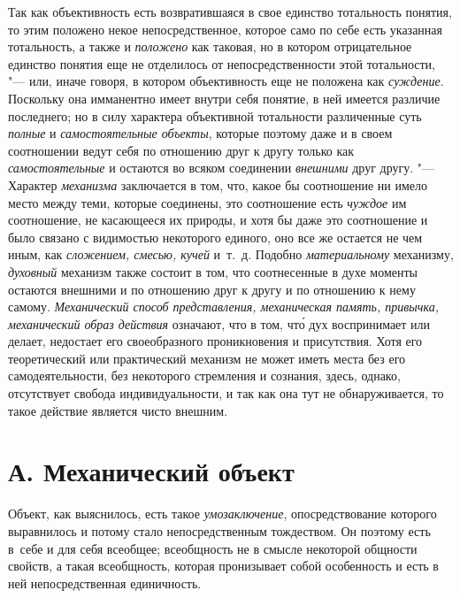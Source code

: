 Так как объективность есть возвратившаяся в свое единство
тотальность понятия, то этим положено некое непосредственное, которое само
по себе есть указанная тотальность, а также и {\em положено} как
таковая, но в котором отрицательное единство понятия еще не отделилось от
непосредственности этой тотальности, "--- или, иначе говоря, в
котором объективность еще не положена как {\em суждение}. Поскольку
она имманентно имеет внутри себя понятие, в ней имеется различие
последнего; но в силу характера объективной тотальности различенные суть
{\em полные} и {\em самостоятельные объекты},
которые поэтому даже и в своем соотношении ведут себя по
отношению друг к другу только как {\em самостоятельные} и
остаются во всяком соединении {\em внешними} друг другу. "--- Характер
{\em механизма} заключается в том, что, какое бы соотношение ни имело место
между теми, которые соединены, это соотношение есть {\em чуждое} им
соотношение, не касающееся их природы, и хотя бы даже это соотношение и
было связано с видимостью некоторого единого, оно все же остается не чем
иным, как {\em сложением, смесью, кучей} и~т.~д. Подобно {\em материальному}
механизму, {\em духовный}
механизм также состоит в том, что соотнесенные в духе моменты
остаются внешними и по отношению друг к другу и по отношению к нему самому.
{\em Механический способ представления, механическая память,
привычка, механический образ действия} означают, что в том,
чт\'{о} дух воспринимает или делает, недостает его
своеобразного проникновения и присутствия. Хотя его
теоретический или практический механизм не может иметь места без его
самодеятельности, без некоторого стремления и сознания, здесь, однако,
отсутствует свобода индивидуальности, и так как она тут не обнаруживается,
то такое действие является чисто внешним.

\section[А. Механический объект]{А. Механический объект}

Объект, как выяснилось, есть такое {\em умозаключение},
опосредствование которого выравнилось и потому стало непосредственным
тождеством. Он поэтому есть в~себе и для себя всеобщее; всеобщность не в
смысле некоторой общности свойств, а такая всеобщность, которая пронизывает
собой особенность и есть в ней непосредственная единичность.

